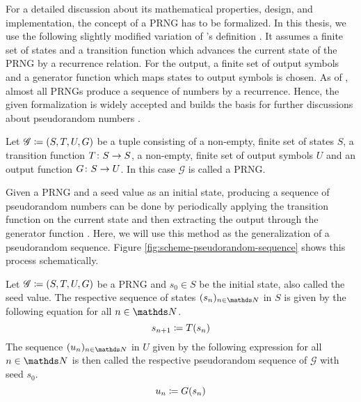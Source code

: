 \documentclass{stdlocal}
\begin{document}
    For a detailed discussion about its mathematical properties, design, and implementation, the concept of a PRNG has to be formalized.
    In this thesis, we use the following slightly modified variation of \citeauthor{lecuyer1994}'s definition \autocite{lecuyer1994,lecuyer2015,barash2017,bauke2007}.
    It assumes a finite set of states and a transition function which advances the current state of the PRNG by a recurrence relation.
    For the output, a finite set of output symbols and a generator function which maps states to output symbols is chosen.
    As of \textcite{bauke2007}, almost all PRNGs produce a sequence of numbers by a recurrence.
    Hence, the given formalization is widely accepted and builds the basis for further discussions about pseudorandom numbers \autocite{lecuyer1994,lecuyer2015,barash2017,bauke2007}.

    \begin{definition}
      Let $\mathscr{G}\coloneqq (S,T,U,G)$ be a tuple consisting of a non-empty, finite set of states $S$, a transition function $T\colon S\to S$, a non-empty, finite set of output symbols $U$ and an output function $G\colon S\to U$.
      In this case $\mathscr{G}$ is called a PRNG.
    \end{definition}

    Given a PRNG and a seed value as an initial state, producing a sequence of pseudorandom numbers can be done by periodically applying the transition function on the current state and then extracting the output through the generator function \autocite{barash2017,lecuyer1994,lecuyer2015}.
    Here, we will use this method as the generalization of a pseudorandom sequence.
    Figure \ref{fig:scheme-pseudorandom-sequence} shows this process schematically.

    \begin{definition}
      Let $\mathscr{G}\coloneqq (S,T,U,G)$ be a PRNG and $s_0\in S$ be the initial state, also called the seed value.
      The respective sequence of states $(s_n)_{n\in\setNatural}$ in $S$ is given by the following equation for all $n\in\setNatural$.
      \[
        s_{n+1} \coloneqq T(s_n)
      \]
      The sequence $(u_n)_{n\in\setNatural}$ in $U$ given by the following expression for all $n\in\setNatural$ is then called the respective pseudorandom sequence of $\mathscr{G}$ with seed $s_0$.
      \[
        u_n \coloneqq G(s_n)
      \]
    \end{definition}
\end{document}
